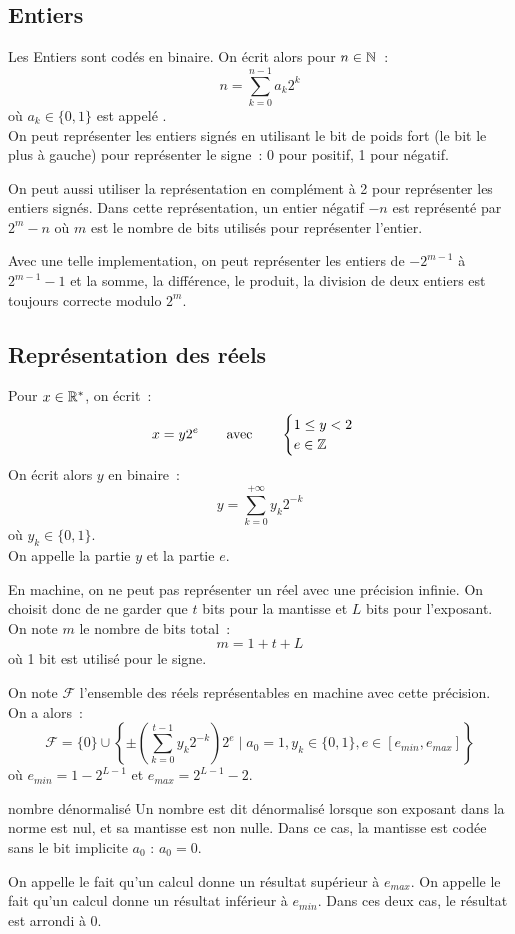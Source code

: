 \subsection{Entiers}
Les Entiers sont codés en binaire. On écrit alors pour $n \in \mathbb{N}$~:
$$n = \sum_{k=0}^{n-1}a_k 2^k$$
où $a_k \in \{0,1\}$ est appelé .\\
On peut représenter les entiers signés en utilisant le bit de poids fort (le bit le plus à gauche) pour représenter le signe~: 0 pour positif, 1 pour négatif.\\\par
On peut aussi utiliser la représentation en complément à 2 pour représenter les entiers signés. Dans cette représentation, un entier négatif $-n$ est représenté par $2^m - n$ où $m$ est le nombre de bits utilisés pour représenter l'entier.\\\par
Avec une telle implementation, on peut représenter les entiers de $-2^{m-1}$ à $2^{m-1}-1$ et la somme, la différence, le produit, la division de deux entiers est toujours correcte modulo $2^m$.

\subsection{Représentation des réels}
Pour $x \in \mathbb{R}^*$, on écrit~:
$$x = y2^e \qquad \text{avec}\qquad \begin{cases}
    1 \leq y < 2\\
    e \in \mathbb{Z}
\end{cases}$$
On écrit alors $y$ en binaire~:
$$y = \sum_{k=0}^{+\infty} y_k 2^{-k}$$
où $y_k \in \{0,1\}$.\\
On appelle  la partie $y$ et  la partie $e$.\\\par
En machine, on ne peut pas représenter un réel avec une précision infinie. On choisit donc de ne garder que $t$ bits pour la mantisse et $L$ bits pour l'exposant.\\
On note $m$ le nombre de bits total~:
$$m = 1 + t + L$$
où 1 bit est utilisé pour le signe.\\\par
On note $\mathcal{F}$ l'ensemble des réels représentables en machine avec cette précision. On a alors~:
$$\mathcal{F} = \{0\} \cup \left\{ \pm \left(\sum_{k=0}^{t-1} y_k 2^{-k}\right) 2^e \mid a_0 = 1, y_k \in \{0,1\}, e \in [e_{min}, e_{max}] \right\}$$
où $e_{min} = 1 - 2^{L-1}$ et $e_{max} = 2^{L-1} - 2$.\\\par
\begin{definition}{}{nombre dénormalisé}
    Un nombre est dit dénormalisé lorsque son exposant dans la norme  est nul, et sa mantisse est non nulle. Dans ce cas, la mantisse est codée sans le bit implicite $a_0$ : $a_0 = 0$.
\end{definition}
On appelle  le fait qu'un calcul donne un résultat supérieur à $e_{max}$. On appelle  le fait qu'un calcul donne un résultat inférieur à $e_{min}$. Dans ces deux cas, le résultat est arrondi à $0$.

